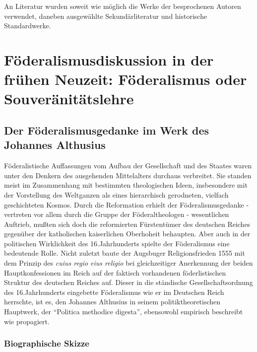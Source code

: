 \documentclass[a4paper,12pt]{article}
\begin{document}
An Literatur wurden soweit wie möglich die Werke der besprochenen
Autoren verwendet, daneben ausgewählte Sekundärliteratur und
historische Standardwerke.


\section{Föderalismusdiskussion in der frühen Neuzeit: Föderalismus oder
Souveränitätslehre}

\subsection{Der Föderalismusgedanke im Werk des Johannes Althusius}

Föderalistische Auffassungen vom Aufbau der Gesellschaft und des
Staates waren unter den Denkern des ausgehenden Mittelalters
durchaus verbreitet. Sie standen meist im Zusammenhang mit
bestimmten theologischen Ideen, insbesondere mit der Vorstellung
des Weltganzen als eines hierarchisch gerodneten, vielfach
geschichteten Kosmos. Durch die Reformation erhielt der
Föderalismusgedanke - vertreten vor allem durch die Gruppe der
Föderaltheologen - wesentlichen Auftrieb, mußten sich doch die
reformierten Fürstentümer des deutschen Reiches gegenüber der
katholischen kaiserlichen Oberhoheit behaupten. Aber auch in der
politischen Wirklichkeit des 16.Jahrhunderts spielte der
Föderalismus eine bedeutende Rolle. Nicht zuletzt baute der
Augsbuger Religionsfrieden 1555 mit dem Prinzip des {\em cuius
regio eius religio} bei gleichzeitiger Anerkennung der beiden
Hauptkonfessionen im Reich auf der faktisch vorhandenen
föderlistischen Struktur des deutschen Reiches auf. Dieser in die
ständische Gesellschaftsordnung des 16.Jahrhunderts eingebette
Föderalismus wie er im Deutschen Reich herrschte, ist es, den
Johannes Althusius in seinem politik\/theoretischen Hauptwerk, der
"`Politica methodice digesta"', ebensowohl empirisch beschreibt wie
propagiert.

\subsubsection{Biographische Skizze}
\end{document}
